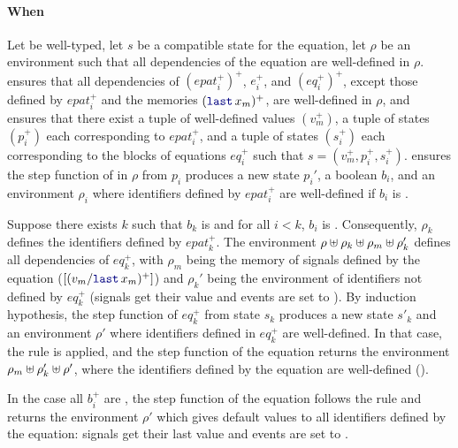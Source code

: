 \begin{skippableproof}
    \paragraph{When}
    Let  be well-typed, let $s$ be a
    compatible state for the equation, let $\rho$ be an environment such that all dependencies of
    the equation are well-defined in $\rho$.
     ensures that all dependencies
    of $(epat_i^+)^+$, $e_i^+$, and $(eq_i^+)^+$, except those defined by $epat_i^+$ and the
    memories $(\last{x_m})^+$, are well-defined in $\rho$, and  ensures that there exist a tuple of well-defined values $(v_m^+)$, a tuple of
    states $(p_i^+)$ each corresponding to $epat_i^+$, and a tuple of states $(s_i^+)$ each
    corresponding to the blocks of equations $eq_i^+$ such that $s = (v_m^+, p_i^+, s_i^+)$.
     ensures the step function of
     in $\rho$ from $p_i$ produces a new state $p_i'$, a boolean $b_i$, and
    an environment $\rho_i$ where identifiers defined by $epat_i^+$ are well-defined if $b_i$ is
    \true.

    Suppose there exists $k$ such that $b_k$ is \true and for all $i < k$, $b_i$ is
    \false. Consequently, $\rho_k$ defines the identifiers defined by $epat_k^+$.
    The environment $\rho \uplus \rho_k \uplus \rho_m \uplus \rho_k'$ defines all dependencies of
    $eq_k^+$, with $\rho_m$ being the memory of signals defined by the  equation
    ($[(v_m/\last{x_m})^+]$) and $\rho_k'$ being the environment of identifiers not defined by
    $eq_k^+$ (signals get their  value and events are set to \none).
    By induction hypothesis, the step function of $eq_k^+$ from state $s_k$ produces a new state
    $s'_k$ and an environment $\rho'$ where identifiers defined in $eq_k^+$ are well-defined.
    In that case, the rule  is applied, and
    the step function of the  equation returns the environment $\rho_m \uplus \rho'_k
        \uplus \rho'$, where the identifiers defined by the  equation are well-defined
    (\cf {}).

    In the case all $b_i^+$ are \false, the step function of the  equation follows
    the rule  and returns the environment
    $\rho'$ which gives default values to all identifiers defined by the  equation:
    signals get their last value and events are set to \none.


\end{skippableproof}
